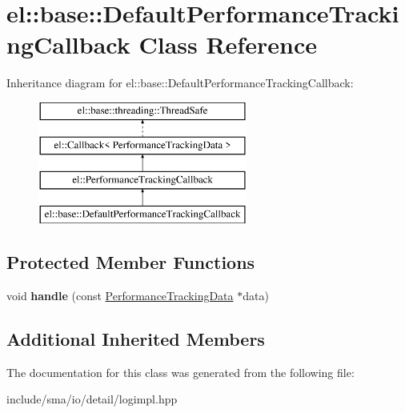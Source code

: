 \hypertarget{classel_1_1base_1_1DefaultPerformanceTrackingCallback}{\section{el\-:\-:base\-:\-:Default\-Performance\-Tracking\-Callback Class Reference}
\label{classel_1_1base_1_1DefaultPerformanceTrackingCallback}
}
Inheritance diagram for el\-:\-:base\-:\-:Default\-Performance\-Tracking\-Callback\-:\begin{figure}[H]
\begin{center}
\leavevmode
\includegraphics[height=4.000000cm]{classel_1_1base_1_1DefaultPerformanceTrackingCallback}
\end{center}
\end{figure}
\subsection*{Protected Member Functions}
\begin{DoxyCompactItemize}
\item 
\hypertarget{classel_1_1base_1_1DefaultPerformanceTrackingCallback_afabb8820e1bd9a7fb89508fe11f59d37}{void {\bfseries handle} (const \hyperlink{classel_1_1PerformanceTrackingData}{Performance\-Tracking\-Data} $\ast$data)}\label{classel_1_1base_1_1DefaultPerformanceTrackingCallback_afabb8820e1bd9a7fb89508fe11f59d37}

\end{DoxyCompactItemize}
\subsection*{Additional Inherited Members}


The documentation for this class was generated from the following file\-:\begin{DoxyCompactItemize}
\item 
include/sma/io/detail/logimpl.\-hpp\end{DoxyCompactItemize}
